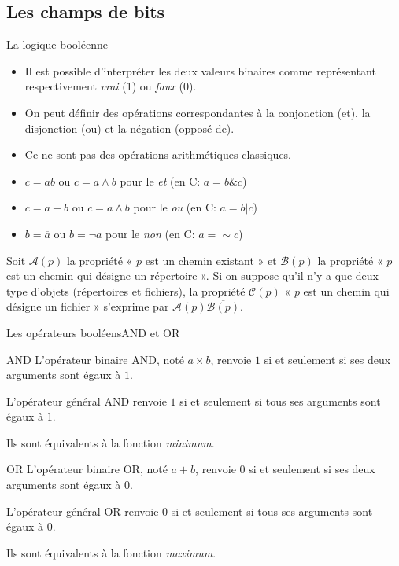 \subsection{Les champs de bits}
\begin{frame}{La logique booléenne}
  \begin{itemize}
  \item Il est possible d'interpréter les deux valeurs binaires comme
    représentant respectivement \emph{vrai} (1) ou \emph{faux} (0).
  \item On peut définir des opérations correspondantes à la conjonction
    (et), la disjonction (ou) et la négation (opposé de).
  \item[\dialogerror] Ce ne sont pas des opérations arithmétiques
    classiques.
  \item[\dialogsystem] $c=ab$ ou $c=a\wedge b$ pour le \emph{et} (en C: $a=b\&c$)
  \item[\dialogsystem] $c=a+b$ ou $c=a\wedge b$ pour le \emph{ou} (en C: $a=b|c$)
  \item[\dialogsystem] $b=\overline{a}$ ou $b=\neg a$ pour le \emph{non} (en C: $a=\sim c$)
  \end{itemize}
  \begin{example}
    Soit $\mathcal A(p)$ la propriété « $p$ est un chemin existant » et
    $\mathcal B(p)$ la propriété « $p$ est un chemin qui désigne un
    répertoire ». Si on suppose qu'il n'y a que deux type d'objets
    (répertoires et fichiers), la propriété $\mathcal C(p)$ « $p$ est un
    chemin qui désigne un fichier » s'exprime par $\mathcal
    A(p)\overline{\mathcal B(p)}$.
  \end{example}
\end{frame}
\begin{frame}{Les opérateurs booléens}{AND et OR}
  \begin{block}{AND}
    L'opérateur binaire AND, noté $a\times b$, renvoie $1$ si et seulement si ses deux arguments sont égaux à $1$.

    L'opérateur général AND renvoie $1$ si et seulement si tous ses arguments sont égaux à $1$.

    Ils sont équivalents à la fonction \emph{minimum}.
  \end{block}
  \begin{block}{OR}
    L'opérateur binaire OR, noté $a+b$, renvoie $0$ si et seulement si ses deux arguments sont égaux à $0$.

    L'opérateur général OR renvoie $0$ si et seulement si tous ses arguments sont égaux à $0$.

    Ils sont équivalents à la fonction \emph{maximum}.
  \end{block}
\end{frame}
